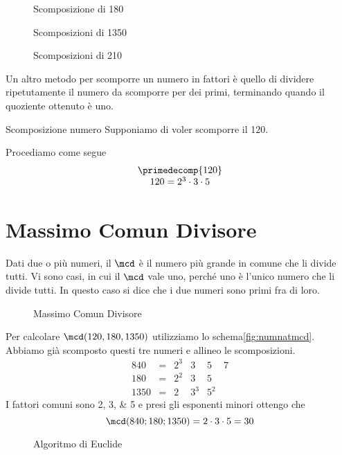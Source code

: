 \begin{figure} 
	\centering

	\caption[]{Scomposizione di \num{180}}
	\label{fig:AlberoBinario2}
\end{figure}
\begin{figure} 
\centering

	\caption[]{Scomposizioni di \num{1350}}
	\label{fig:AlberoBinario3}
\end{figure}%
\begin{figure} 
\centering

	\caption[]{Scomposizioni di \num{210}}
	\label{fig:AlberoBinario6}
\end{figure}%
Un altro metodo per scomporre un numero in fattori  è quello di dividere ripetutamente  il numero da scomporre per dei primi, terminando quando il quoziente ottenuto è uno.
\begin{esempiot}{Scomposizione numero}{}
Supponiamo di voler scomporre il \num{120}. 
\end{esempiot}
Procediamo come segue
	\[
	\begin{array}{c}
	\primedecomp{120}\\
	120 =2^3\cdot 3\cdot 5
	\end{array}
	\]

\section{Massimo Comun Divisore}
\label{sec:macdNaturali}
Dati due o più numeri, il $\mcd$ è il numero più grande in comune che li divide tutti. Vi sono casi, in cui il $\mcd$ vale uno, perché uno è l'unico numero che li divide tutti. In questo caso si dice che i due numeri sono primi fra di loro.
 	\begin{figure}
	\centering

	\caption{Massimo Comun Divisore}
	\label{fig:numnatmcd}
\end{figure}
 Per calcolare $\mcd(120,180,1350)$ utilizziamo lo schema\nobs\vref{fig:numnatmcd}. Abbiamo già scomposto questi tre numeri e  	
 allineo le scomposizioni.
   \[
   \begin{array}{rcllll}
   840&= & 2^3 & 3& 5 & 7\\
   180&= & 2^2 & 3& 5 \\
   1350&= & 2 & 3^3& 5^2
   \end{array}
   \]
   I fattori comuni sono \numlist{2;3;5} e presi gli esponenti minori ottengo che
     \[\mcd(840;180;1350)=2\cdot 3\cdot 5=30 \]
    \begin{figure}
    	\centering
    
    	\caption{Algoritmo di Euclide}
    	\label{fig:algoritmoEuclide}
    \end{figure}
   
